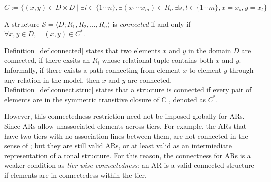 \begin{definition}[Connectedness]
$ C := \{
    (x,y) \in D \times D \mid  \exists i \in \{1 \cdots n\},
    \exists (x_1 \cdots x_m) \in R_i,
    \exists s, t \in \{1 \cdots m\},
    x = x_s, y = x_t
\}$
\label{def.connected}
\end{definition}

\begin{definition}
    \label{def.connect.struc}
A structure $\mathcal{S} = \langle D; R_1, R_2, \ldots, R_n \rangle$ is
\emph{connected} if and only if
\(
    \forall x,y \in D,\quad (x,y) \in C^{*}.
\)
\end{definition}


Definition~\ref{def.connected} states that two elements $x$ and $y$ in 
the domain $D$ are connected, if there exsits an \(R_i\) whose relational 
tuple contains both \(x\) and \(y\). Informally, if there exists a path 
connecting from element \(x\) to element \(y\) through any relation in 
the model, then \(x\) and \(y\) are connected. Definition~\ref{def.connect.struc} 
states that a structure is connected if every pair of elements are in 
the symmetric transitive closure of C , denoted as \(C^{*}\).

However, this connectedness restriction need not be imposed globally for ARs.
Since ARs allow unassociated elements across tiers. For example, the ARs
that have two tiers with no association lines between them, are not connected in the sense of \citet
{chandleeBufia2019}; but they are still valid ARs, or at least valid as an intermiediate 
representation of a tonal structure. For this reason, the connectness for ARs is a
weaker condition as \emph{tier-wise connectedness}: an AR is a valid connected structure
if elements are in connectedess within the tier. 

